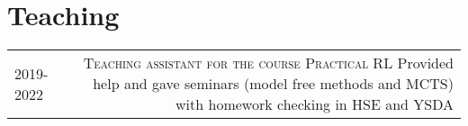 \section*{\sectionformat Teaching}
\begin{tabular}{@{}L!{\VRule}R}
    2019-2022  {} &
    {\textsc{Teaching assistant for the course Practical RL}} Provided help and gave seminars (model free methods and MCTS) with homework checking in HSE and YSDA
\end{tabular}
